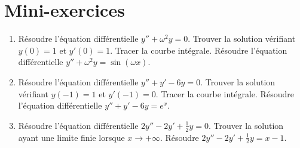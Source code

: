  \section*{Mini-exercices}

\begin{frame}
\begin{miniexercice}
\begin{enumerate}
  \item Résoudre l'équation différentielle $y'' + \omega^2y=0$.
  Trouver la solution vérifiant $y(0)=1$ et $y'(0)=1$. 
  Tracer la courbe intégrale.
  Résoudre l'équation différentielle $y'' + \omega^2y= \sin(\omega x)$.
  
  \item Résoudre l'équation différentielle $y'' + y' -6y=0$.
  Trouver la solution vérifiant $y(-1)=1$ et $y'(-1)=0$. 
  Tracer la courbe intégrale.
  Résoudre l'équation différentielle $y'' + y' -6y= e^x$.
  
  \item Résoudre l'équation différentielle $2y'' -2 y' +\frac12 y=0$.
  Trouver la solution ayant une limite finie lorsque $x\to +\infty$.
  Résoudre $2y'' -2 y' +\frac12 y=x-1$.
\end{enumerate}
\end{miniexercice}
\end{frame}





